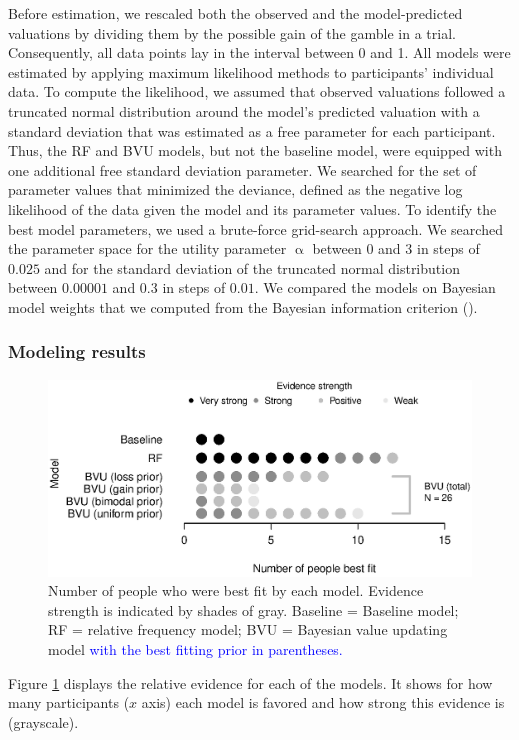 \documentclass[a4paper, man, natbib, floatsintext]{apa6} %
\begin{document}
Before estimation, we rescaled both the observed and the model-predicted valuations by dividing them by the possible gain of the gamble in a trial. Consequently, all data points lay in the interval between 0 and 1. All models were estimated by applying maximum likelihood methods to participants' individual data. To compute the likelihood, we assumed that observed valuations followed a truncated normal distribution around the model's predicted valuation with a standard deviation that was estimated as a free parameter for each participant. Thus, the RF and BVU models, but not the baseline model, were equipped with one additional free standard deviation parameter. We searched for the set of parameter values that minimized the deviance, defined as the negative log likelihood of the data given the model and its parameter values. To identify the best model parameters, we used a brute-force grid-search approach. We searched the parameter space for the utility parameter $\upalpha$ between $0$ and $3$ in steps of $0.025$ and for the standard deviation of the truncated normal distribution between $0.00001$ and $0.3$ in steps of $0.01$. We compared the models on Bayesian model weights that we computed from the Bayesian information criterion (\citealp{Kass1995, Lewandowsky2011}).

\subsubsection{Modeling results}
\begin{figure}[htbp] 
  \centering
\includegraphics[width=.9\linewidth, keepaspectratio]{modelcomp_rs1.eps}
  \caption{Number of people who were best fit by each model. Evidence strength is indicated by shades of gray. Baseline = Baseline model; RF = relative frequency model; BVU = Bayesian value updating model \textcolor{blue}{ with the best fitting prior in parentheses.} }
  \label{fig:modeling1}
\end{figure}
Figure \ref{fig:modeling1} displays the relative evidence for each of the models. It shows for how many participants ($x$ axis) each model is favored and how strong this evidence is (grayscale). 
\end{document}
